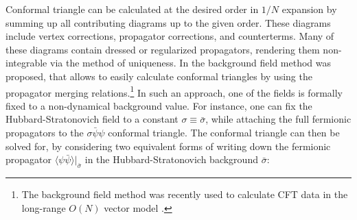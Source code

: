 \documentclass[aps,amsmath,amssymb,prd,showpacs,floatfix,preprint,superscriptaddress,nofootinbib,12pt]{article}
\begin{document}
Conformal triangle can be calculated at the desired order in $1/N$ expansion
by summing up all contributing diagrams up to the given order. These diagrams include vertex corrections,
propagator corrections, and counterterms. Many of these diagrams contain dressed or regularized
propagators, rendering them non-integrable via the method of uniqueness. In \cite{Goykhman:2020ffn}
the background field method was proposed,
that allows to easily calculate conformal triangles by using the propagator merging relations.\footnote{The
background field method was recently used to calculate CFT data in the long-range $O(N)$
vector model \cite{Chai:2021arp}.}
In such an approach, one of the fields is formally fixed to a non-dynamical background value.
For instance, one can fix the Hubbard-Stratonovich
field to a constant $\sigma \equiv \bar\sigma$, while attaching the full fermionic propagators
to the $\sigma\bar\psi\psi$ conformal triangle. The conformal triangle can then be solved for,
by considering two equivalent forms of writing down the fermionic propagator $\langle\psi\bar\psi\rangle|_{\bar\sigma}$ in the
Hubbard-Stratonovich background $\bar\sigma$:
\end{document}

